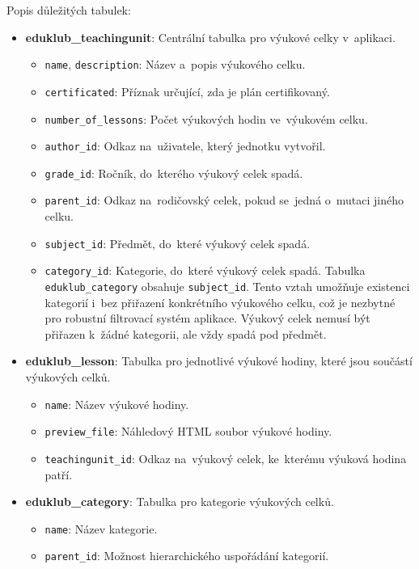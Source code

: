 \documentclass[male,czech,api_bc]{kitheses}
\begin{document}
Popis důležitých tabulek:
\begin{itemize}
	\item \textbf{eduklub\_teachingunit}: Centrální tabulka pro výukové celky v~aplikaci.
	\begin{itemize}
		\item \texttt{name}, \texttt{description}: Název a~popis výukového celku.
		\item \texttt{certificated}: Příznak určující, zda je plán certifikovaný.
		\item \texttt{number\_of\_lessons}: Počet výukových hodin ve~výukovém celku.
		\item \texttt{author\_id}: Odkaz na~uživatele, který jednotku vytvořil.
		\item \texttt{grade\_id}: Ročník, do~kterého výukový celek spadá.
		\item \texttt{parent\_id}: Odkaz na~rodičovský celek, pokud se~jedná o~mutaci jiného celku.
		\item \texttt{subject\_id}: Předmět, do~které výukový celek spadá.
		\item \texttt{category\_id}: Kategorie, do~které výukový celek spadá. Tabulka \texttt{eduklub\_category} obsahuje \texttt{subject\_id}. Tento vztah umožňuje existenci kategorií i~bez přiřazení konkrétního výukového celku, což je nezbytné pro robustní filtrovací systém aplikace. Výukový celek nemusí být přiřazen k~žádné kategorii, ale vždy spadá pod předmět.
		
	\end{itemize}
	
	\item \textbf{eduklub\_lesson}: Tabulka pro jednotlivé výukové hodiny, které jsou součástí výukových celků.
	\begin{itemize}
		\item \texttt{name}: Název výukové hodiny.
		\item \texttt{preview\_file}: Náhledový HTML soubor výukové hodiny.
		\item \texttt{teachingunit\_id}: Odkaz na~výukový celek, ke~kterému výuková hodina patří.
	\end{itemize}
	
	\item \textbf{eduklub\_category}: Tabulka pro kategorie výukových celků.
	\begin{itemize}
		\item \texttt{name}: Název kategorie.
		\item \texttt{parent\_id}: Možnost hierarchického uspořádání kategorií.
	\end{itemize}
	

\end{itemize}
\end{document}

